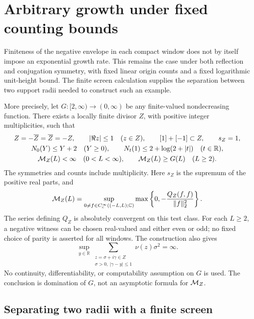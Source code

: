 \section{Arbitrary growth under fixed counting bounds}
\label{sec:arbitrary-growth}

Finiteness of the negative envelope in each compact window does not
by itself impose an exponential growth rate. This remains the case
under both reflection and conjugation symmetry, with fixed linear
origin counts and a fixed logarithmic unit-height bound. The finite
screen calculation supplies the separation between two support
radii needed to construct such an example.

More precisely, let \(G:[2,\infty)\to(0,\infty)\) be any
finite-valued nondecreasing function. There exists a locally finite
divisor \(Z\), with positive integer multiplicities, such that
\begin{gather}
 Z=-\overline Z=\overline Z=-Z,\qquad
 |\Re z|\le1\quad(z\in Z),\qquad
 [1]+[-1]\subset Z,\qquad s_Z=1,
 \label{arb:symmetry}\\
 N_0(Y)\le Y+2\quad(Y\ge0),\qquad
 N_t(1)\le2+\log(2+|t|)\quad(t\in\mathbb R),
 \label{arb:counts}\\
 \mathcal M_Z(L)<\infty\quad(0<L<\infty),\qquad
 \mathcal M_Z(L)\ge G(L)\quad(L\ge2).
 \label{arb:conclusion}
\end{gather}
The symmetries and counts include multiplicity. Here \(s_Z\) is
the supremum of the positive real parts, and
\[
 \mathcal M_Z(L)=
 \sup_{0\ne f\in C_c^\infty((-L,L);\mathbb C)}
 \max\left\{0,-\frac{Q_Z(f,f)}{\|f\|_2^2}\right\}.
\]
The series defining \(Q_Z\) is absolutely convergent on this
test class. For each \(L\ge2\), a negative witness can be
chosen real-valued and either even or odd; no fixed choice of
parity is asserted for all windows. The construction also gives
\begin{equation}\label{arb:weighted-failure}
 \sup_{y\in\mathbb R}
 \sum_{\substack{z=\sigma+i\gamma\in Z\\
                  \sigma>0,\ |\gamma-y|\le1}}
       \nu(z)\sigma^2=\infty.
\end{equation}
No continuity, differentiability, or computability assumption on
\(G\) is used. The conclusion is domination of \(G\), not an
asymptotic formula for \(\mathcal M_Z\).

\subsection{Separating two radii with a finite screen}

